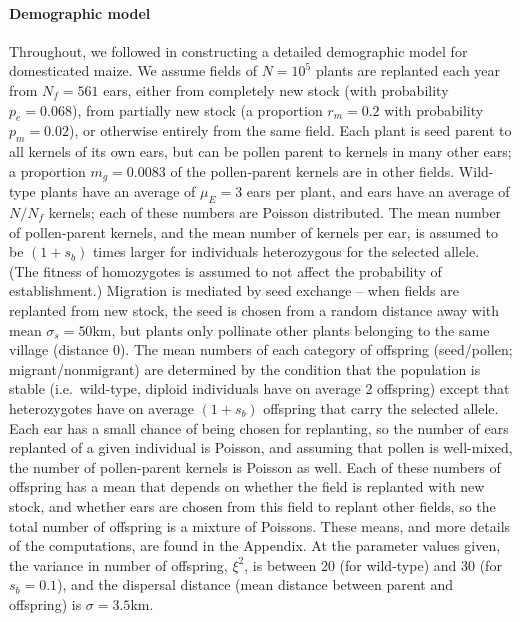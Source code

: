 \paragraph{Demographic model}
Throughout, we followed \citet{vanHeerwaarden2010} in constructing a detailed demographic model for domesticated maize.
We assume fields of $N=10^5$ plants are replanted each year from $N_f=561$ ears, either from completely new stock (with probability $p_e=0.068$), from partially new stock (a proportion $r_m=0.2$ with probability $p_m=0.02$), or  otherwise entirely from the same field.
Each plant is seed parent to all kernels of its own ears, but can be pollen parent to kernels in many other ears; a proportion $m_g=0.0083$ of the pollen-parent kernels are in other fields.
Wild-type plants have an average of $\mu_E=3$ ears per plant, and ears have an average of $N/N_f$ kernels; each of these numbers are Poisson distributed.
The mean number of pollen-parent kernels, and the mean number of kernels per ear, is assumed to be $(1+s_b)$ times larger for individuals heterozygous for the selected allele.
(The fitness of homozygotes is assumed to not affect the probability of establishment.)
Migration is mediated by seed exchange -- when fields are replanted from new stock, the seed is chosen from a random distance away with mean $\sigma_s=50$km, but plants only pollinate other plants belonging to the same village (distance 0).
The mean numbers of each category of offspring (seed/pollen; migrant/nonmigrant) are determined by the condition that the population is stable 
(i.e.\ wild-type, diploid individuals have on average 2 offspring) 
except that heterozygotes have on average $(1+s_b)$ offspring that carry the selected allele.
Each ear has a small chance of being chosen for replanting, so the number of ears replanted of a given individual is Poisson, and assuming that pollen is well-mixed, the number of pollen-parent kernels is Poisson as well.
Each of these numbers of offspring has a mean that depends on whether the field is replanted with new stock, and whether ears are chosen from this field to replant other fields, so the total number of offspring is a mixture of Poissons. 
These means, and more details of the computations, are found in the Appendix. %
At the parameter values given, the variance in number of offspring, $\xi^2$, is between 20 (for wild-type) and 30 (for $s_b=0.1$), and the dispersal distance (mean distance between parent and offspring) is $\sigma=3.5$km.

